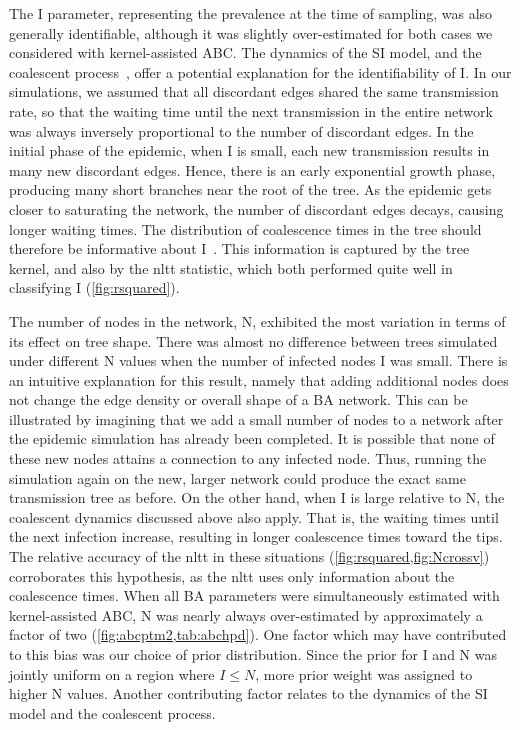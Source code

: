 The \gls{I} parameter, representing the prevalence at the time of sampling, was
also generally identifiable, although it was slightly over-estimated for both
cases we considered with kernel-assisted \gls{ABC}. The dynamics of the \gls{SI} model,
and the coalescent process~\autocite{kingman1982coalescent}, offer a potential
explanation for the identifiability of \gls{I}. In our simulations, we assumed
that all discordant edges shared the same transmission rate, so that the
waiting time until the next transmission in the entire network was always
inversely proportional to the number of discordant edges. In the initial phase
of the epidemic, when \gls{I} is small, each new transmission results in many
new discordant edges. Hence, there is an early exponential growth phase,
producing many short branches near the root of the tree. As the epidemic gets
closer to saturating the network, the number of discordant edges decays,
causing longer waiting times. The distribution of coalescence times in the tree
should therefore be informative about \gls{I}~\autocite{volz2009phylodynamics}.
This information is captured by the tree kernel, and also by the \gls{nltt}
statistic, which both performed quite well in classifying \gls{I}
(\cref{fig:rsquared}). 

The number of nodes in the network, \gls{N}, exhibited the most variation in
terms of its effect on tree shape. There was almost no difference between trees
simulated under different \gls{N} values when the number of infected nodes
\gls{I} was small. There is an intuitive explanation for this result, namely
that adding additional nodes does not change the edge density or overall shape
of a \gls{BA} network. This can be illustrated by imagining that we add a small
number of nodes to a network after the epidemic simulation has already been
completed. It is possible that none of these new nodes attains a connection to
any infected node. Thus, running the simulation again on the new, larger
network could produce the exact same transmission tree as before. On the other
hand, when \gls{I} is large relative to \gls{N}, the coalescent dynamics
discussed above also apply. That is, the waiting times until the next infection
increase, resulting in longer coalescence times toward the tips. The relative
accuracy of the \gls{nltt} in these situations
(\cref{fig:rsquared,fig:Ncrossv}) corroborates this hypothesis, as the
\gls{nltt} uses only information about the coalescence times. When all \gls{BA}
parameters were simultaneously estimated with kernel-assisted \gls{ABC}, \gls{N} was
nearly always over-estimated by approximately a factor of two
(\cref{fig:abcptm2,tab:abchpd}). One factor which may have contributed to this
bias was our choice of prior distribution. Since the prior for \gls{I} and
\gls{N} was jointly uniform on a region where $I \leq N$, more prior weight was
assigned to higher \gls{N} values. Another contributing factor relates to the
dynamics of the \gls{SI} model and the coalescent process.

